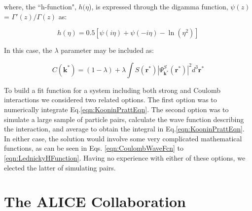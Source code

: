 \documentclass[ALICE,manyauthors]{cernphprep}
\begin{document}
where, the ``h-function", $h(\eta$), is expressed through the digamma function, $\psi(z)$ = $\Gamma'(z)/\Gamma(z)$ as:

\begin{equation}
 h(\eta) = 0.5[\psi(i\eta) + \psi(-i\eta) - \ln(\eta^{2})]
\label{eqn:LednickyHFunction}
\end{equation} 

In this case, the $\lambda$ parameter may be included as: 

\begin{equation}
 C(\mathbf{k^{*}}) = (1 - \lambda) + \lambda\int S(\mathbf{r^{*}})|\Psi^{S}_{\mathbf{k^{*}}}(\mathbf{r^{*}})|^{2}d^{3}\mathbf{r^{*}}
\label{eqn:GenCfEqnwLambda}
\end{equation}

To build a fit function for a system including both strong and Coulomb interactions we considered two related options. 
The first option was to numerically integrate Eq.\ref{eqn:KooninPrattEqn}.  
The second option was to simulate a large sample of particle pairs, calculate the wave function describing the interaction, and average to obtain the integral in Eq.\ref{eqn:KooninPrattEqn}. 
In either case, the solution would involve some very complicated mathematical functions, as can be seen in Eqs. \ref{eqn:CoulombWaveFcn} to \ref{eqn:LednickyHFunction}.
Having no experience with either of these options, we elected the latter of simulating pairs.


\section{The ALICE Collaboration}
\label{app:collab}
\end{document}

